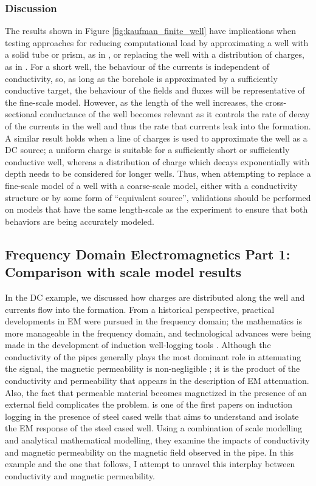 \subsubsection{Discussion}

The results shown in Figure \ref{fig:kaufman_finite_well} have implications when testing approaches for reducing computational load by approximating a well with a solid tube or prism, as in \cite{Um2015}, or replacing the well with a distribution of charges, as in \cite{Weiss2016}. For a short well, the behaviour of the currents is independent of conductivity, so, as long as the borehole is approximated by a sufficiently conductive target, the behaviour of the fields and fluxes will be representative of the fine-scale model. However, as the length of the well increases, the cross-sectional conductance of the well becomes relevant as it controls the rate of decay of the currents in the well and thus the rate that currents leak into the formation. A similar result holds when a line of charges is used to approximate the well as a DC source; a uniform charge is suitable for a sufficiently short or sufficiently conductive well, whereas a distribution of charge which decays exponentially with depth needs to be considered for longer wells. Thus, when attempting to replace a fine-scale model of a well with a coarse-scale model, either with a conductivity structure or by some form of ``equivalent source'', validations should be performed on models that have the same length-scale as the experiment to ensure that both behaviors are being accurately modeled.

\subsection{Frequency Domain Electromagnetics Part 1: Comparison with scale model results}
\label{sec:FDEM_part1}

In the DC example, we discussed how charges are distributed along the well and currents flow into the formation. From a historical perspective, practical developments in EM were pursued in the frequency domain; the mathematics is more manageable in the frequency domain, and technological advances were being made in the development of induction well-logging tools \citep{Doll1949, Moran1962}. Although the conductivity of the pipes generally plays the most dominant role in attenuating the signal, the magnetic permeability is non-negligible \citep{Wait1977}; it is the product of the conductivity and permeability that appears in the description of EM attenuation. Also, the fact that permeable material becomes magnetized in the presence of an external field complicates the problem.
\cite{Augustin1989} is one of the first papers on induction logging in the presence of steel cased wells that aims to understand and isolate the EM response of the steel cased well. Using a combination of scale modelling and analytical mathematical modelling, they examine the impacts of conductivity and magnetic permeability on the magnetic field observed in the pipe. In this example and the one that follows, I attempt to unravel this interplay between conductivity and magnetic permeability.

